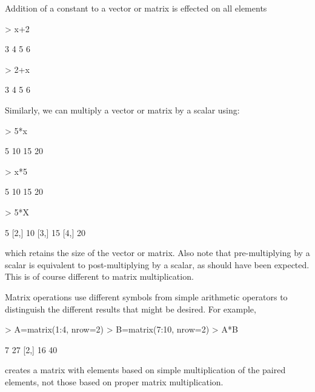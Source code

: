 Addition of a constant to a vector or matrix is effected on all elements 
\begin{Schunk}
\begin{Sinput}
> x+2 
\end{Sinput}
\begin{Soutput}
[1] 3 4 5 6
\end{Soutput}
\begin{Sinput}
> 2+x 
\end{Sinput}
\begin{Soutput}
[1] 3 4 5 6
\end{Soutput}
\end{Schunk}
Similarly, we can multiply a vector or matrix by a scalar using: 
\begin{Schunk}
\begin{Sinput}
> 5*x 
\end{Sinput}
\begin{Soutput}
[1]  5 10 15 20
\end{Soutput}
\begin{Sinput}
> x*5 
\end{Sinput}
\begin{Soutput}
[1]  5 10 15 20
\end{Soutput}
\begin{Sinput}
> 5*X 
\end{Sinput}
\begin{Soutput}
     [,1]
[1,]    5
[2,]   10
[3,]   15
[4,]   20
\end{Soutput}
\end{Schunk}
which retains the size of the vector or matrix. Also note that pre-multiplying by a scalar is equivalent to post-multiplying by a scalar, as should have been expected. This is of course different to matrix multiplication. 
 
Matrix operations use different symbols from simple arithmetic operators to distinguish the different results that might be desired. For example, 
\begin{Schunk}
\begin{Sinput}
> A=matrix(1:4, nrow=2) 
> B=matrix(7:10, nrow=2) 
> A*B 
\end{Sinput}
\begin{Soutput}
     [,1] [,2]
[1,]    7   27
[2,]   16   40
\end{Soutput}
\end{Schunk}
creates a matrix with elements based on simple multiplication of the paired elements, not those based on proper matrix multiplication. 
 
